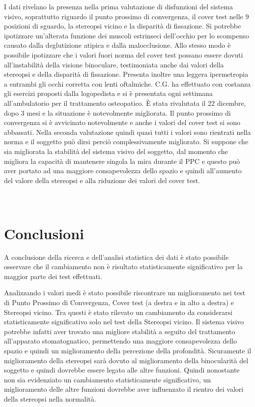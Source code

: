 I dati rivelano la presenza nella prima valutazione di disfunzioni del sistema visivo, soprattutto riguardo il punto prossimo di convergenza, il cover test nelle 9 posizioni di sguardo, la stereopsi vicino e la disparità di fissazione. Si potrebbe ipotizzare un'alterata funzione dei muscoli estrinseci dell’occhio per lo scompenso causato dalla deglutizione atipica e dalla malocclusione. Allo stesso modo è possibile ipotizzare che i valori fuori norma del cover test possano essere dovuti all’instabilità della visione binoculare, testimoniata anche dai valori della stereopsi e della disparità di fissazione. Presenta inoltre una leggera ipermetropia a entrambi gli occhi corretta con lenti oftalmiche. 
C.G. ha effettuato con costanza gli esercizi proposti dalla logopedista e si è presentata ogni settimana all’ambulatorio per il trattamento osteopatico. È stata rivalutata il 22 dicembre, dopo 3 mesi e la situazione è notevolmente migliorata. Il punto prossimo di convergenza si è avvicinato notevolmente e anche i valori del cover test si sono abbassati. Nella seconda valutazione quindi quasi tutti i valori sono rientrati nella norma e il soggetto può dirsi perciò complessivamente migliorato.
Si suppone che sia migliorata la stabilità del sistema visivo del soggetto, dal momento che migliora la capacità di mantenere singola la mira durante il PPC e questo può aver portato ad una maggiore consapevolezza dello spazio e quindi all’aumento del valore della stereopsi e alla riduzione dei valori del cover test. 
\\\ \\\


\section{Conclusioni}

A conclusione della ricerca e dell’analisi statistica dei dati è stato possibile osservare che il cambiamento non è risultato statisticamente significativo per la maggior parte dei test effettuati.

Analizzando i valori medi è stato possibile riscontrare un miglioramento nei test di Punto Prossimo di Convergenza, Cover test (a destra e in alto a destra) e Stereopsi vicino. Tra questi è stato rilevato un cambiamento da considerarsi statisticamente significativo solo nel test della Stereopsi vicino. Il sistema visivo potrebbe infatti aver trovato una migliore stabilità a seguito del trattamento all’apparato stomatognatico, permettendo una maggiore consapevolezza dello spazio e quindi un miglioramento della percezione della profondità. Sicuramente il miglioramento della stereopsi sarà dovuto al miglioramento della binocularità del soggetto e quindi dovrebbe essere legato alle altre funzioni. Quindi nonostante non sia evidenziato un cambiamento statisticamente significativo, un miglioramento delle altre funzioni dovrebbe aver influenzato il rientro dei valori della stereopsi nella normalità.
 
